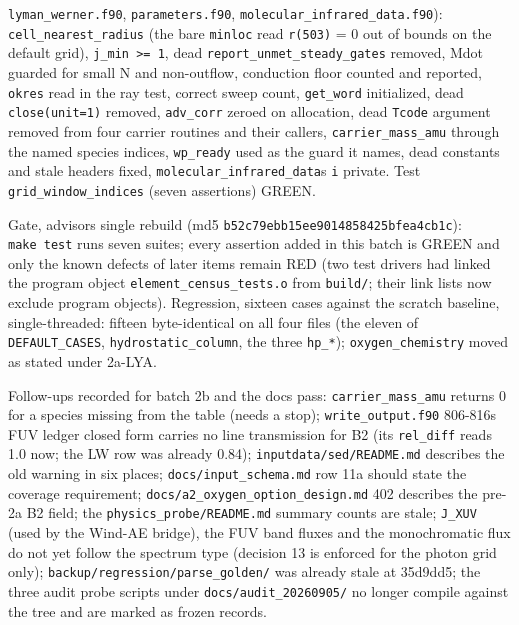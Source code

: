 \documentclass[english,a4paper]{my_memo}
\begin{document}
\begin{itemize}
  \texttt{lyman\_werner.f90}, \texttt{parameters.f90}, \texttt{molecular\_infrared\_data.f90}):
  \texttt{cell\_nearest\_radius} (the bare \texttt{minloc} read \texttt{r(503)} = 0 out of bounds
  on the default grid), \texttt{j\_min\ \textgreater{}=\ 1}, dead \texttt{report\_unmet\_steady\_gates}
  removed, Mdot guarded for small N and non-outflow, conduction floor
  counted and reported, \texttt{okres} read in the ray test, correct sweep count,
  \texttt{get\_word} initialized, dead \texttt{close(unit=1)} removed, \texttt{adv\_corr} zeroed on
  allocation, dead \texttt{Tcode} argument removed from four carrier routines and
  their callers, \texttt{carrier\_mass\_amu} through the named species indices,
  \texttt{wp\_ready} used as the guard it names, dead constants and stale headers
  fixed, \texttt{molecular\_infrared\_data}\textquotesingle s \texttt{i} private. Test \texttt{grid\_window\_indices}
  (seven assertions) GREEN.
\end{itemize}

Gate, advisor\textquotesingle s single rebuild (md5 \texttt{b52c79ebb15ee9014858425bfea4cb1c}):
\texttt{make\ test} runs seven suites; every assertion added in this batch is GREEN
and only the known defects of later items remain RED (two test drivers had
linked the program object \texttt{element\_census\_tests.o} from \texttt{build/}; their link
lists now exclude program objects). Regression, sixteen cases against the
scratch baseline, single-threaded: fifteen byte-identical on all four
files (the eleven of \texttt{DEFAULT\_CASES}, \texttt{hydrostatic\_column}, the three
\texttt{hp\_*}); \texttt{oxygen\_chemistry} moved as stated under 2a-LYA.

Follow-ups recorded for batch 2b and the docs pass: \texttt{carrier\_mass\_amu}
returns 0 for a species missing from the table (needs a stop);
\texttt{write\_output.f90} 806-816\textquotesingle s FUV ledger closed form carries no line
transmission for B2 (its \texttt{rel\_diff} reads 1.0 now; the LW row was already
0.84); \texttt{inputdata/sed/README.md} describes the old warning in six places;
\texttt{docs/input\_schema.md} row 11a should state the coverage requirement;
\texttt{docs/a2\_oxygen\_option\_design.md} 402 describes the pre-2a B2 field; the
\texttt{physics\_probe/README.md} summary counts are stale; \texttt{J\_XUV} (used by the
Wind-AE bridge), the FUV band fluxes and the monochromatic flux do not yet
follow the spectrum type (decision 13 is enforced for the photon grid only);
\texttt{backup/regression/parse\_golden/} was already stale at 35d9dd5; the three
audit probe scripts under \texttt{docs/audit\_20260905/} no longer compile against
the tree and are marked as frozen records.
\end{document}
